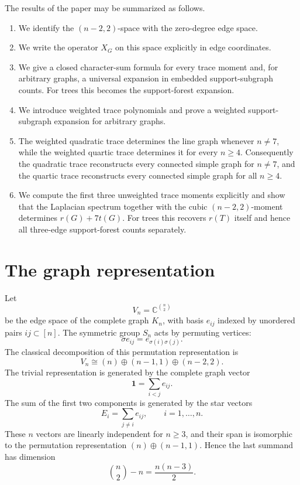 \documentclass{amsart}
\theoremstyle{definition}
\newcommand{\C}{\mathbb C}
\begin{document}
The results of the paper may be summarized as follows.
\begin{enumerate}[label=\textup{(\roman*)}]
\item We identify the $(n-2,2)$-space with the zero-degree edge space.
\item We write the operator $X_G$ on this space explicitly in edge
coordinates.
\item We give a closed character-sum formula for every trace moment and,
for arbitrary graphs, a universal expansion in embedded support-subgraph
counts.  For trees this becomes the support-forest expansion.
\item We introduce weighted trace polynomials and prove a weighted
support-subgraph expansion for arbitrary graphs.
\item The weighted quadratic trace determines the line graph whenever
$n\neq7$, while the weighted quartic trace determines it for every $n\geq4$.
Consequently the quadratic trace reconstructs every connected simple graph
for $n\neq7$, and the quartic trace reconstructs every connected simple
graph for all $n\geq4$.
\item We compute the first three unweighted trace moments explicitly and
show that the Laplacian spectrum together with the cubic $(n-2,2)$-moment
determines $r(G)+7t(G)$.  For trees this recovers $r(T)$ itself and hence all
three-edge support-forest counts separately.
\end{enumerate}

\section{The graph representation}

Let
\[
V_n=\C^{\binom n2}
\]
be the edge space of the complete graph $K_n$, with basis $e_{ij}$ indexed
by unordered pairs $ij\subset [n]$.  The symmetric group $S_n$ acts by
permuting vertices:
\[
\sigma e_{ij}=e_{\sigma(i)\sigma(j)}.
\]
The classical decomposition of this permutation representation is
\cite{Sagan}
\[
V_n\cong (n)\oplus(n-1,1)\oplus(n-2,2).            \tag{2.1}
\]
The trivial representation is generated by the complete graph vector
\[
\mathbf 1=\sum_{i<j}e_{ij}.
\]
The sum of the first two components is generated by the star vectors
\[
E_i=\sum_{j\ne i}e_{ij},\qquad i=1,\ldots,n.
\]
These $n$ vectors are linearly independent for $n\geq 3$, and their span
is isomorphic to the permutation representation $(n)\oplus(n-1,1)$.
Hence the last summand has dimension
\[
\binom n2-n=\frac{n(n-3)}2.
\]
\end{document}
